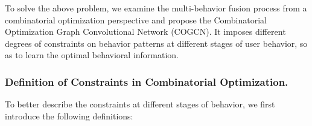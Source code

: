 To solve the above problem, we examine the multi-behavior fusion process from a combinatorial optimization perspective and propose the Combinatorial Optimization Graph Convolutional Network (COGCN). It imposes different degrees of constraints on behavior patterns at different stages of user behavior, so as to learn the optimal behavioral information.

\subsubsection{Definition of Constraints in Combinatorial Optimization.}
To better describe the constraints at different stages of behavior, we first introduce the following definitions:






